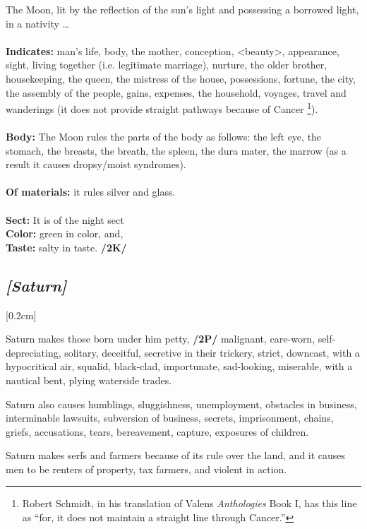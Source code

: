 The  Moon, lit by the reflection of the sun’s light and possessing a borrowed light, in a nativity \ldots \\
\\
\textbf{Indicates:} man’s life, body, the mother, conception, <beauty>, appearance, sight, living together (i.e. legitimate marriage), nurture, the older brother, housekeeping, the queen, the mistress of the house, possessions, fortune, the city, the assembly of the people, gains, expenses, the household, voyages, travel and wanderings (it does not provide straight pathways because of Cancer
\footnote{Robert Schmidt, in his translation of Valens \textit{Anthologies} Book I, has this line as ``for, it does not maintain a straight line through Cancer.''}). \\
\\
\textbf{Body:} The Moon rules the parts of the body as follows: the left eye, the stomach, the breasts, the breath, the spleen, the dura mater, the marrow (as a result it causes dropsy/moist syndromes). \\
\\
\textbf{Of materials:} it rules silver and glass. \\
\\
\textbf{Sect:} It is of the night sect \\
\textbf{Color:} green in color, and, \\
\textbf{Taste:} salty in taste. \textbf{/2K/}
\secbr
\subsection{\textit{[Saturn]}}
[0.2cm]

 Saturn makes those born under him petty, \textbf{/2P/} malignant, care-worn, self-depreciating, solitary, deceitful, secretive in their trickery, strict, downcast, with a hypocritical air, squalid, black-clad, importunate, sad-looking, miserable, with a nautical bent, plying waterside trades. 

Saturn also causes humblings, sluggishness, unemployment, obstacles in business, interminable lawsuits, subversion of business, secrets, imprisonment, chains, griefs, accusations, tears, bereavement, capture, exposures of children. 

Saturn makes serfs and farmers because of its rule over the land, and it causes men to be renters of property, tax farmers, and violent in action. 

